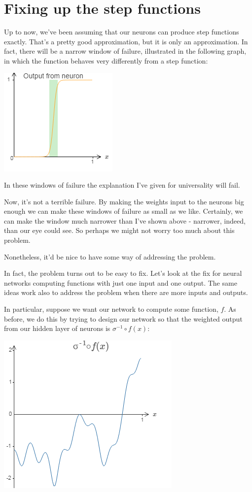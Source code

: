 \section{Fixing up the step functions}

Up to now, we've been assuming that our neurons can produce step functions exactly. That's a pretty good approximation, but it is only an approximation. In fact, there will be a narrow window of failure, illustrated in the following graph, in which the function behaves very differently from a step function:

{\centering \includegraphics[width=.5\textwidth,]{pic/wigglyfn39} \par}

In these windows of failure the explanation I've given for universality will fail.

Now, it's not a terrible failure. By making the weights input to the neurons big enough we can make these windows of failure as small as we like. Certainly, we can make the window much narrower than I've shown above - narrower, indeed, than our eye could see. So perhaps we might not worry too much about this problem.

Nonetheless, it'd be nice to have some way of addressing the problem.

In fact, the problem turns out to be easy to fix. Let's look at the fix for neural networks computing functions with just one input and one output. The same ideas work also to address the problem when there are more inputs and outputs.

In particular, suppose we want our network to compute some function, $f$. As before, we do this by trying to design our network so that the weighted output from our hidden layer of neurons is $\sigma^{-1}\circ f(x)$:

{\centering \includegraphics[width=.5\textwidth,]{pic/wigglyfn40} \par}

